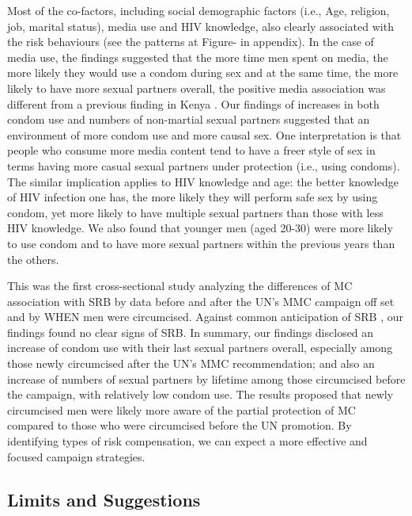 \documentclass[12pt,]{article}
\begin{document}
Most of the co-factors, including social demographic factors (i.e., Age,
religion, job, marital status), media use and HIV knowledge, also
clearly associated with the risk behaviours (see the patterns at Figure-
in appendix). In the case of media use, the findings suggested that the
more time men spent on media, the more likely they would use a condom
during sex and at the same time, the more likely to have more sexual
partners overall, the positive media association was different from a
previous finding in Kenya \autocite{MuzyLaur12}. Our findings of
increases in both condom use and numbers of non-martial sexual partners
suggested that an environment of more condom use and more causal sex.
One interpretation is that people who consume more media content tend to
have a freer style of sex in terms having more casual sexual partners
under protection (i.e., using condoms). The similar implication applies
to HIV knowledge and age: the better knowledge of HIV infection one has,
the more likely they will perform safe sex by using condom, yet more
likely to have multiple sexual partners than those with less HIV
knowledge. We also found that younger men (aged 20-30) were more likely
to use condom and to have more sexual partners within the previous years
than the others.

This was the first cross-sectional study analyzing the differences of MC
association with SRB by data before and after the UN's MMC campaign off
set and by WHEN men were circumcised. Against common anticipation of SRB
\autocites{Acle86}{CameSimo89}{Lind88}{HalpBail99}{AbboHabe13}{AndeCock12}{BrooEtze10}{CassHalp06}{EatoKali09}{EatoCain11}{GreeMaha13}{GrunHenn12}{GustKres11}{HeweHall12}{KaliEato07}{L_EnLanh14}{MattCamp10}{PadiBuve08}{RiesAchi10}{SACE09}{WestAgot12},
our findings found no clear signs of SRB. In summary, our findings
disclosed an increase of condom use with their last sexual partners
overall, especially among those newly circumcised after the UN's MMC
recommendation; and also an increase of numbers of sexual partners by
lifetime among those circumcised before the campaign, with relatively
low condom use. The results proposed that newly circumcised men were
likely more aware of the partial protection of MC compared to those who
were circumcised before the UN promotion. By identifying types of risk
compensation, we can expect a more effective and focused campaign
strategies.

\subsection{Limits and Suggestions}\label{limits-and-suggestions}
\end{document}
